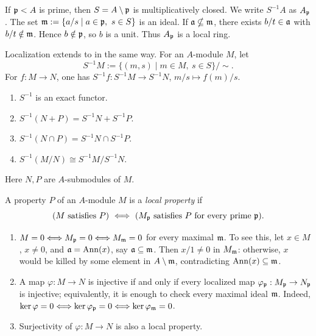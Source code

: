 \documentclass[11pt,a4paper]{article}
\begin{document}
\setcounter{example}{4}\begin{example}
If $\pp<A$ is prime, then $S=A\setminus\pp$ is multiplicatively closed. We write $S^{-1}A$ as $A_{\pp}$. The set $\mm:=\{a/s\mid a\in\pp,\ s\in S\}$ is an ideal. If $\aa\nsubseteq\mm$, there exists $b/t\in\aa$ with $b/t\notin\mm$. Hence $b\notin\pp$, so $b$ is a unit. Thus $A_{\pp}$ is a local ring.
\end{example}
Localization extends to  in the same way. For an $A$-module $M$, let
\[S^{-1}M:=\{(m,s)\mid m\in M,\ s\in S\}/{\sim}.\]
For $f:M\to N$, one has $S^{-1}f:S^{-1}M\to S^{-1}N$, $m/s\mapsto f(m)/s$.
\setcounter{theorem}{5}\begin{proposition}
\begin{enumerate}[label=(\roman*)]
\setcounter{enumi}{0}\item $S^{-1}$ is an exact functor.
\setcounter{enumi}{1}\item $S^{-1}(N+P)=S^{-1}N+S^{-1}P$.
\setcounter{enumi}{2}\item $S^{-1}(N\cap P)=S^{-1}N\cap S^{-1}P$.
\setcounter{enumi}{3}\item $S^{-1}(M/N)\cong S^{-1}M/S^{-1}N$.
\end{enumerate}
Here $N,P$ are $A$-submodules of $M$.
\end{proposition}
A property $P$ of an $A$-module $M$ is a \emph{local property} if
\[
(M\text{ satisfies }P)\ \Longleftrightarrow\
(M_{\pp}\text{ satisfies }P\text{ for every prime }\pp).
\]
\setcounter{example}{5}\begin{example}
\begin{enumerate}[label=(\roman*)]
\setcounter{enumi}{0}\item $M=0\Longleftrightarrow M_{\pp}=0\Longleftrightarrow M_{\mm}=0$ for every maximal $\mm$. To see this, let $x\in M$, $x\ne0$, and $\aa=\Ann(x)$, say $\aa\subseteq\mm$. Then $x/1\ne0$ in $M_{\mm}$: otherwise, $x$ would be killed by some element in $A\setminus\mm$, contradicting $\Ann(x)\subseteq\mm$.
\setcounter{enumi}{1}\item A map $\varphi:M\to N$ is injective if and only if every localized map $\varphi_{\pp}:M_{\pp}\to N_{\pp}$ is injective; equivalently, it is enough to check every maximal ideal $\mm$. Indeed, $\ker\varphi=0\Longleftrightarrow\ker\varphi_{\pp}=0\Longleftrightarrow\ker\varphi_{\mm}=0$.
\setcounter{enumi}{2}\item Surjectivity of $\varphi:M\to N$ is also a local property.
\end{enumerate}
\end{example}
\end{document}
